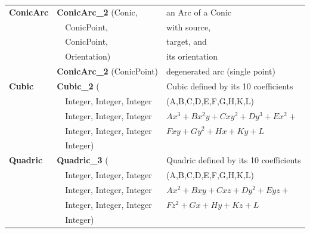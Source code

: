 \begin{ccTexOnly}
\begin{tabular}{*{3}{| l} |}
{\bf ConicArc}      & {\bf ConicArc\_2} (Conic,    & an Arc of a Conic \\
              & \ \ ConicPoint,                    & with source,\\
              & \ \ ConicPoint,                    & target, and\\
              & \ \ Orientation)                   & its orientation\\
              & {\bf ConicArc\_2} (ConicPoint)      & degenerated arc (single point) \\ \hline


{\bf Cubic} & {\bf Cubic\_2} (        & Cubic defined by its 10 coefficients \\
      & \ \ Integer, Integer, Integer & (A,B,C,D,E,F,G,H,K,L)\\
      & \ \ Integer, Integer, Integer & \begin{math} Ax^3+Bx^2y+Cxy^2+Dy^3+Ex^2+ \end{math}\\
      & \ \ Integer, Integer, Integer & \begin{math}Fxy+Gy^2+Hx+Ky+L\end{math}\\
      & \ \ Integer)                  & \\ \hline

{\bf Quadric} & {\bf Quadric\_3} (      & Quadric defined by its 10 coefficients \\
        & \ \ Integer, Integer, Integer & (A,B,C,D,E,F,G,H,K,L)\\
        & \ \ Integer, Integer, Integer & \begin{math} Ax^2+Bxy+Cxz+Dy^2+Eyz+ \end{math}\\
        & \ \ Integer, Integer, Integer & \begin{math}Fz^2+Gx+Hy+Kz+L\end{math}\\
        & \ \ Integer)                  & \\ \hline
\end{tabular}
\end{ccTexOnly}

